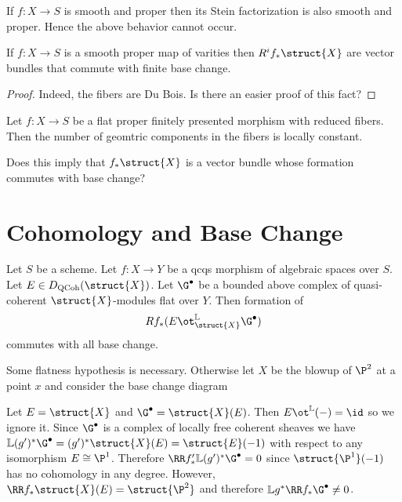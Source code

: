 \documentclass[12pt]{article}
\newcommand{\LL}{\mathbb{L}}
\begin{document}
\begin{prop}[Conrad]
If $f : X \to S$ is smooth and proper then its Stein factorization is also smooth and proper. Hence the above behavior cannot occur. 
\end{prop}

\begin{prop}
If $f : X \to S$ is a smooth proper map of varities then $R^i f_* \struct{X}$ are vector bundles that commute with finite base change.
\end{prop}

\begin{proof}
Indeed, the fibers are Du Bois. Is there an easier proof of this fact?
\end{proof}

\begin{prop}
Let $f : X \to S$ be a flat proper finitely presented morphism with reduced fibers. Then the number of geomtric components in the fibers is locally constant.
\end{prop}

Does this imply that $f_* \struct{X}$ is a vector bundle whose formation commutes with base change?

\section{Cohomology and Base Change}

\begin{prop}
Let $S$ be a scheme. Let $f : X \to Y$ be a qcqs morphism of algebraic spaces over $S$. Let $E \in D_{\mathrm{QCoh}}(\struct{X})$. Let $\G^\bullet$ be a bounded above complex of quasi-coherent $\struct{X}$-modules flat over $Y$. Then formation of 
\[ R f_* (E \ot_{\struct{X}}^{\LL} \G^\bullet) \]
commutes with all base change.
\end{prop}

\begin{example}
Some flatness hypothesis is necessary. Otherwise let $X$ be the blowup of $\P^2$ at a point $x$ and consider the base change diagram
\begin{center}
\end{center}
Let $E = \struct{X}$ and $\G^\bullet = \struct{X}(E)$. Then $E \ot^{\LL} (-) = \id$ so we ignore it. Since $\G^\bullet$ is a complex of locally free coherent sheaves we have $\LL (g')^* \G^\bullet = (g')^* \struct{X}(E) = \struct{E}(-1)$ with respect to any isomorphism $E \cong \P^1$. Therefore $\RR f'_* \LL (g')^* \G^\bullet = 0$ since $\struct{\P^1}(-1)$ has no cohomology in any degree. However, $\RR f_* \struct{X}(E) = \struct{\P^2}$ and therefore $\LL g^* \RR f_* \G^\bullet \neq 0$.
\end{example}
\end{document}

